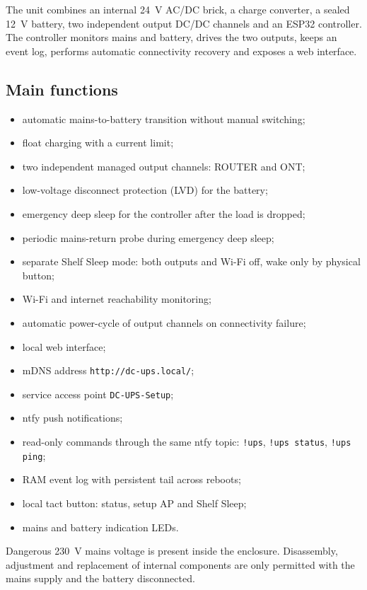 \documentclass[11pt,a4paper]{article}
\begin{document}
The unit combines an internal 24~V AC/DC brick, a charge converter, a sealed 12~V battery, two independent output DC/DC channels and an ESP32 controller. The controller monitors mains and battery, drives the two outputs, keeps an event log, performs automatic connectivity recovery and exposes a web interface.

\subsection{Main functions}
\begin{itemize}[leftmargin=7mm]
  \item automatic mains-to-battery transition without manual switching;
  \item float charging with a current limit;
  \item two independent managed output channels: ROUTER and ONT;
  \item low-voltage disconnect protection (LVD) for the battery;
  \item emergency deep sleep for the controller after the load is dropped;
  \item periodic mains-return probe during emergency deep sleep;
  \item separate Shelf Sleep mode: both outputs and Wi-Fi off, wake only by physical button;
  \item Wi-Fi and internet reachability monitoring;
  \item automatic power-cycle of output channels on connectivity failure;
  \item local web interface;
  \item mDNS address \texttt{http://dc-ups.local/};
  \item service access point \texttt{DC-UPS-Setup};
  \item ntfy push notifications;
  \item read-only commands through the same ntfy topic: \texttt{!ups}, \texttt{!ups status}, \texttt{!ups ping};
  \item RAM event log with persistent tail across reboots;
  \item local tact button: status, setup AP and Shelf Sleep;
  \item mains and battery indication LEDs.
\end{itemize}

\begin{tcolorbox}[colback=lightwarn,colframe=warn,title=Important]
Dangerous 230~V mains voltage is present inside the enclosure. Disassembly, adjustment and replacement of internal components are only permitted with the mains supply and the battery disconnected.
\end{tcolorbox}
\end{document}
